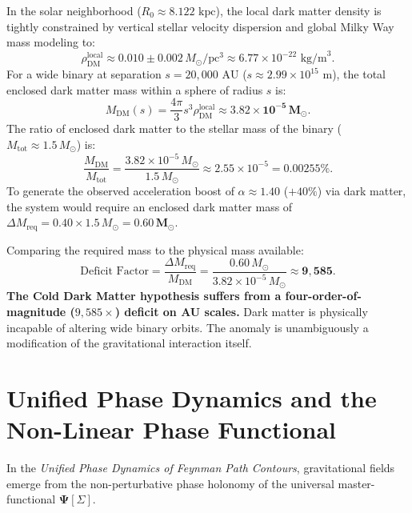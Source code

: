 \documentclass[11pt,a4paper]{article}
\begin{document}
In the solar neighborhood ($R_0 \approx 8.122\text{ kpc}$), the local dark matter density is tightly constrained by vertical stellar velocity dispersion and global Milky Way mass modeling to:
\begin{equation}
\rho_{\mathrm{DM}}^{\mathrm{local}} \approx 0.010 \pm 0.002\, M_\odot/\text{pc}^3 \approx 6.77 \times 10^{-22}\text{ kg/m}^3.
\end{equation}
For a wide binary at separation $s = 20,000\text{ AU}$ ($s \approx 2.99 \times 10^{15}\text{ m}$), the total enclosed dark matter mass within a sphere of radius $s$ is:
\begin{equation}
M_{\mathrm{DM}}(s) = \frac{4\pi}{3} s^3 \rho_{\mathrm{DM}}^{\mathrm{local}} \approx \mathbf{3.82 \times 10^{-5}\, M_\odot}.
\end{equation}
The ratio of enclosed dark matter to the stellar mass of the binary ($M_{\mathrm{tot}} \approx 1.5\,M_\odot$) is:
\begin{equation}
\frac{M_{\mathrm{DM}}}{M_{\mathrm{tot}}} = \frac{3.82 \times 10^{-5}\, M_\odot}{1.5\, M_\odot} \approx 2.55 \times 10^{-5} = \mathbf{0.00255\%}.
\end{equation}
To generate the observed acceleration boost of $\alpha \approx 1.40$ ($+40\%$) via dark matter, the system would require an enclosed dark matter mass of $\Delta M_{\mathrm{req}} = 0.40 \times 1.5\, M_\odot = \mathbf{0.60\, M_\odot}$.

Comparing the required mass to the physical mass available:
\begin{equation}
\text{Deficit Factor} = \frac{\Delta M_{\mathrm{req}}}{M_{\mathrm{DM}}} = \frac{0.60\, M_\odot}{3.82 \times 10^{-5}\, M_\odot} \approx \mathbf{9,585}.
\end{equation}
\textbf{The Cold Dark Matter hypothesis suffers from a four-order-of-magnitude ($9,585\times$) deficit on AU scales.} Dark matter is physically incapable of altering wide binary orbits. The anomaly is unambiguously a modification of the gravitational interaction itself.

\section{Unified Phase Dynamics and the Non-Linear Phase Functional}
In the \textit{Unified Phase Dynamics of Feynman Path Contours}, gravitational fields emerge from the non-perturbative phase holonomy of the universal master-functional $\mathbf{\Psi}[\Sigma]$. 
\end{document}
